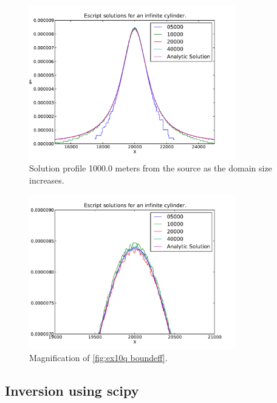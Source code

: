\begin{figure}[ht]
\centering
\includegraphics[width=0.8\textwidth]{figures/ex10q_boundeff.pdf}
\caption{Solution profile 1000.0 meters from the source as the domain size
increases.}
\label{fig:ex10q boundeff}
\end{figure}

\begin{figure}[ht]
\centering
\includegraphics[width=0.8\textwidth]{figures/ex10q_boundeff_zoom.pdf}
\caption{Magnification of \autoref{fig:ex10q boundeff}.}
\label{fig:ex10q boundeff zoom}
\end{figure}
\clearpage

\subsection{Inversion using scipy}